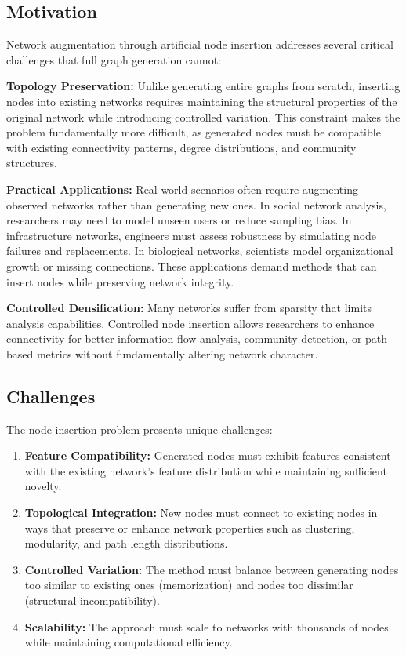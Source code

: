 \documentclass[12pt]{article}
\begin{document}
\subsection{Motivation}

Network augmentation through artificial node insertion addresses several critical challenges that full graph generation cannot:

\textbf{Topology Preservation:} Unlike generating entire graphs from scratch, inserting nodes into existing networks requires maintaining the structural properties of the original network while introducing controlled variation. This constraint makes the problem fundamentally more difficult, as generated nodes must be compatible with existing connectivity patterns, degree distributions, and community structures.

\textbf{Practical Applications:} Real-world scenarios often require augmenting observed networks rather than generating new ones. In social network analysis, researchers may need to model unseen users or reduce sampling bias. In infrastructure networks, engineers must assess robustness by simulating node failures and replacements. In biological networks, scientists model organizational growth or missing connections. These applications demand methods that can insert nodes while preserving network integrity.

\textbf{Controlled Densification:} Many networks suffer from sparsity that limits analysis capabilities. Controlled node insertion allows researchers to enhance connectivity for better information flow analysis, community detection, or path-based metrics without fundamentally altering network character.

\subsection{Challenges}

The node insertion problem presents unique challenges:

\begin{enumerate}
    \item \textbf{Feature Compatibility:} Generated nodes must exhibit features consistent with the existing network's feature distribution while maintaining sufficient novelty.
    
    \item \textbf{Topological Integration:} New nodes must connect to existing nodes in ways that preserve or enhance network properties such as clustering, modularity, and path length distributions.
    
    \item \textbf{Controlled Variation:} The method must balance between generating nodes too similar to existing ones (memorization) and nodes too dissimilar (structural incompatibility).
    
    \item \textbf{Scalability:} The approach must scale to networks with thousands of nodes while maintaining computational efficiency.
\end{enumerate}
\end{document}
